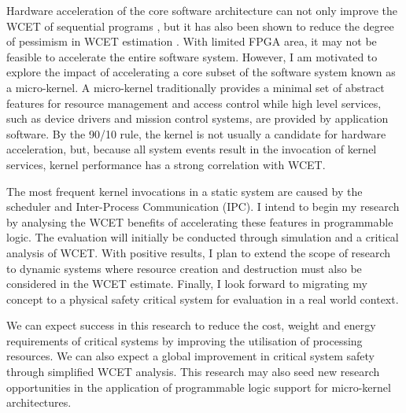 Hardware acceleration of the core software architecture can not only improve the WCET of sequential
programs \cite{warp, micro_hyp}, but it has also 
been shown to reduce the degree of pessimism in WCET estimation \cite{aud_hardimp}.
With limited FPGA area, it may not be feasible to
accelerate the entire software system. However, I am motivated to explore the impact of accelerating a
core subset of the software system known as a micro-kernel. A micro-kernel traditionally provides a minimal
set of abstract features for resource management and access control while high level services, such as
device drivers and mission control systems, are provided by application software.
By the 90/10 rule, the kernel is not usually a candidate for hardware acceleration, but, because all
system events result in the invocation of kernel services, kernel performance has a strong correlation
with WCET.

The most frequent kernel invocations in a static system are caused by the scheduler and Inter-Process
Communication (IPC). I intend to begin my research by analysing the WCET benefits of accelerating these
features in programmable logic. The evaluation will initially be conducted through simulation and a
critical analysis of WCET. With positive results, I plan to extend the scope of research to dynamic
systems where resource creation and destruction must also be considered in the WCET estimate. Finally,
I look forward to migrating my concept to a physical safety critical system for evaluation in a real
world context.

We can expect success in this research to reduce the cost, weight and energy requirements of critical
systems by improving the utilisation of processing resources. We can also expect a global improvement
in critical system safety through simplified WCET analysis. This research may also seed new research
opportunities in the application of programmable logic support for micro-kernel architectures.



%



